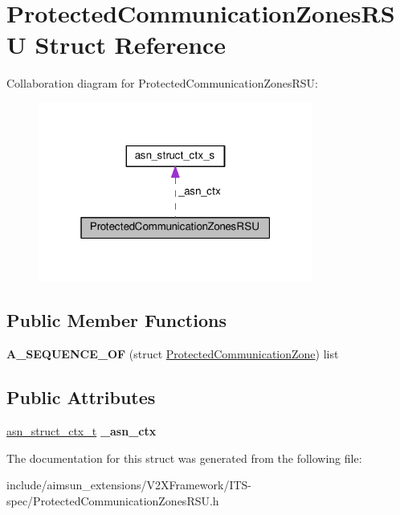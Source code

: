 \hypertarget{structProtectedCommunicationZonesRSU}{}\section{Protected\+Communication\+Zones\+R\+SU Struct Reference}
\label{structProtectedCommunicationZonesRSU}


Collaboration diagram for Protected\+Communication\+Zones\+R\+SU\+:\nopagebreak
\begin{figure}[H]
\begin{center}
\leavevmode
\includegraphics[width=256pt]{structProtectedCommunicationZonesRSU__coll__graph}
\end{center}
\end{figure}
\subsection*{Public Member Functions}
\begin{DoxyCompactItemize}
\item 
{\bfseries A\+\_\+\+S\+E\+Q\+U\+E\+N\+C\+E\+\_\+\+OF} (struct \hyperlink{structProtectedCommunicationZone}{Protected\+Communication\+Zone}) list\hypertarget{structProtectedCommunicationZonesRSU_a9e877ddfc31e27c6159243b32697ca3d}{}\label{structProtectedCommunicationZonesRSU_a9e877ddfc31e27c6159243b32697ca3d}

\end{DoxyCompactItemize}
\subsection*{Public Attributes}
\begin{DoxyCompactItemize}
\item 
\hyperlink{structasn__struct__ctx__s}{asn\+\_\+struct\+\_\+ctx\+\_\+t} {\bfseries \+\_\+asn\+\_\+ctx}\hypertarget{structProtectedCommunicationZonesRSU_ab7247d3e08249e055b516e43c9be1220}{}\label{structProtectedCommunicationZonesRSU_ab7247d3e08249e055b516e43c9be1220}

\end{DoxyCompactItemize}


The documentation for this struct was generated from the following file\+:\begin{DoxyCompactItemize}
\item 
include/aimsun\+\_\+extensions/\+V2\+X\+Framework/\+I\+T\+S-\/spec/Protected\+Communication\+Zones\+R\+S\+U.\+h\end{DoxyCompactItemize}

